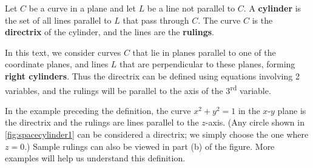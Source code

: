 \begin{definition}[Cylinder]\label{def:cylinder}%
Let $C$ be a curve in a plane and let $L$ be a line not parallel to $C$. A \textbf{cylinder} is the set of all lines parallel to $L$ that pass through $C$. The curve $C$ is the \textbf{directrix} of the cylinder, and the lines are the \textbf{rulings}.
\end{definition}

In this text, we consider curves $C$ that lie in planes parallel to one of the coordinate planes, and lines $L$ that are perpendicular to these planes, forming \textbf{right cylinders}. Thus the directrix can be defined using equations involving 2 variables, and the rulings will be parallel to the axis of the 3\textsuperscript{rd} variable.

In the example preceding the definition, the curve $x^2+y^2=1$ in the $x$-$y$ plane is the directrix and the rulings are lines parallel to the $z$-axis. (Any circle shown in \autoref{fig:spacecylinder1} can be considered a directrix; we simply choose the one where $z=0$.) Sample rulings can also be viewed in part (b) of the figure. More examples will help us understand this definition.

